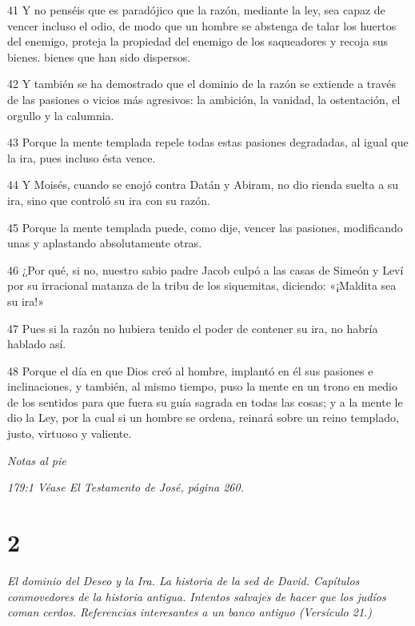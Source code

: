 \par 41 Y no penséis que es paradójico que la razón, mediante la ley, sea capaz de vencer incluso el odio, de modo que un hombre se abstenga de talar los huertos del enemigo, proteja la propiedad del enemigo de los saqueadores y recoja sus bienes. bienes que han sido dispersos.

\par 42 Y también se ha demostrado que el dominio de la razón se extiende a través de las pasiones o vicios más agresivos: la ambición, la vanidad, la ostentación, el orgullo y la calumnia.

\par 43 Porque la mente templada repele todas estas pasiones degradadas, al igual que la ira, pues incluso ésta vence.

\par 44 Y Moisés, cuando se enojó contra Datán y Abiram, no dio rienda suelta a su ira, sino que controló su ira con su razón.

\par 45 Porque la mente templada puede, como dije, vencer las pasiones, modificando unas y aplastando absolutamente otras.

\par 46 ¿Por qué, si no, nuestro sabio padre Jacob culpó a las casas de Simeón y Leví por su irracional matanza de la tribu de los siquemitas, diciendo: «¡Maldita sea su ira!»

\par 47 Pues si la razón no hubiera tenido el poder de contener su ira, no habría hablado así.

\par 48 Porque el día en que Dios creó al hombre, implantó en él sus pasiones e inclinaciones, y también, al mismo tiempo, puso la mente en un trono en medio de los sentidos para que fuera su guía sagrada en todas las cosas; y a la mente le dio la Ley, por la cual si un hombre se ordena, reinará sobre un reino templado, justo, virtuoso y valiente.

\par \textit{Notas al pie}

\par \textit{179:1 Véase El Testamento de José, página 260.}

\chapter{2}

\par \textit{El dominio del Deseo y la Ira. La historia de la sed de David. Capítulos conmovedores de la historia antigua. Intentos salvajes de hacer que los judíos coman cerdos. Referencias interesantes a un banco antiguo (Versículo 21.)}

